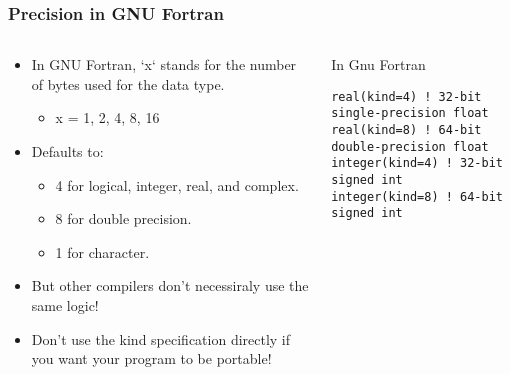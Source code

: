 \documentclass[10pt,aspectratio=169]{beamer}
\begin{document}
\begin{frame}[fragile]
  \frametitle{Precision in GNU Fortran}
  \begin{columns}[T]
    \begin{column}{0.5\textwidth}
      \begin{itemize}
        \item In GNU Fortran, `x` stands for the number of bytes used for the data type.
            \begin{itemize}
            \item x = 1, 2, 4, 8, 16
          \end{itemize}
        \item Defaults to:
          \begin{itemize}
            \item 4 for logical, integer, real, and complex.
            \item 8 for double precision.
            \item 1 for character.
          \end{itemize}
        \item But other compilers don't necessiraly use the same logic!
        \item Don’t use the kind specification directly if you want your program to be portable!
      \end{itemize}
    \end{column}

    \begin{column}{0.5\textwidth}
        In Gnu Fortran\\

      \begin{lstlisting}
real(kind=4) ! 32-bit single-precision float
real(kind=8) ! 64-bit double-precision float
integer(kind=4) ! 32-bit signed int
integer(kind=8) ! 64-bit signed int
      \end{lstlisting}
    \end{column}
  \end{columns}
\end{frame}
\end{document}
